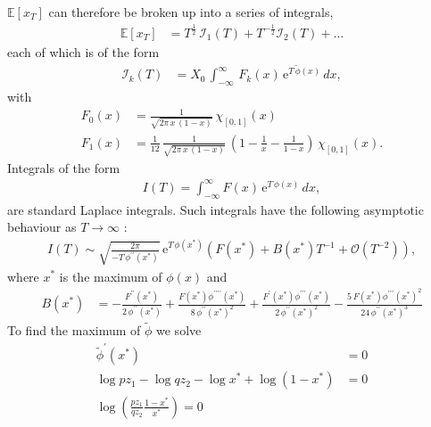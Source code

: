 \documentclass[11pt]{article}
\begin{document}
$\mathbb{E}\left[x_T \right] $ can therefore be broken up into a series of integrals,
\begin{align}
\label{eq-Ex-mult2}
\mathbb{E}\left[x_T \right] &= T^\frac{1}{2}\, \mathcal{I}_1(T) + T^{-\frac{1}{2}} \mathcal{I}_2(T) +\ldots 
\end{align}
each of which is of the form
\begin{align}
\label{eq-Fk-mult}
 \mathcal{I}_k(T) & =  X_0\, \int_{-\infty}^\infty\, F_k(x) \,\mathrm{e}^{T\,\widetilde{\phi}(x)}\, d x,
\end{align}
with
\begin{align}
\label{eq-ampl0} F_0(x) &=  \frac{1}{\sqrt{2 \pi \,x\,(1-x)}} \, \chi_{\left[0, 1\right]}(x)\\
\label{eq-ampl1} F_1(x) &=  \frac{1}{12}\, \frac{1}{\sqrt{2 \pi \,x\,(1-x)}} \, \left( 1-\frac{1}{x} - \frac{1}{1-x}\right)\,\chi_{\left[0, 1\right]}(x).
\end{align}
Integrals of the form
\begin{align}
\label{eq-LaplaceIntegral0}
I(T) = \int_{-\infty}^{\infty} F(x)\,\mathrm{e}^{T\,\phi(x)}\, dx,
\end{align}
are standard Laplace integrals. Such integrals have the following asymptotic behaviour as $T \to \infty$ \cite{bender2013advanced}:
\begin{align}
\label{eq-LaplaceAsymptoticFormula}
I(T) \sim \sqrt{\frac{2\pi }{-T\,\phi^{\prime\prime}(x^*)}}\,\mathrm{e}^{T \,\phi(x^*)}\left(F(x^*)+B(x^*) T^{-1}+\mathcal{O}\left(T^{-2}\right)\right),
\end{align}
where $x^*$ is the maximum of $\phi(x)$ and
\begin{align}
\label{eq-LaplaceAsymptoticFormulaLeadingCorrection}
B(x^*) &=  - \frac{F^{\prime\prime}(x^*)}{2\, \phi^{\prime\prime}(x^*)} 
                 + \frac{F(x^*) \phi^{\prime\prime\prime\prime}(x^*)}{8\,\phi^{\prime\prime}(x^*)^2}
                 + \frac{F^\prime(x^*) \phi^{\prime\prime\prime}(x^*)}{2\,\phi^{\prime\prime}(x^*)^2}
                 - \frac{5\,F(x^*) \phi^{\prime\prime\prime}(x^*)^2}{24\,\phi^{\prime\prime}(x^*)^3}
\end{align}
To find the maximum of $\widetilde{\phi}$ we solve
\begin{align*}
\widetilde{\phi}^\prime (x^*) &= 0\\
 \log p z_1 - \log q z_2 - \log x^* + \log (1-x^*) &= 0\\
 \log \left( \frac{p z_1}{q z_2} \frac{1-x^*}{x^*}\right) = 0
\end{align*}
\end{document}
